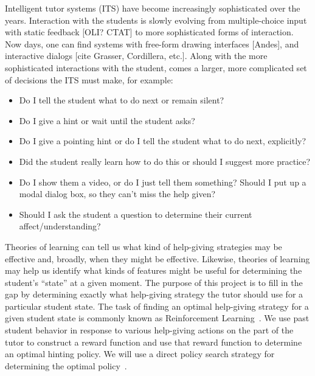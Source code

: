 \documentclass{edm_template}
\begin{document}
Intelligent tutor systems (ITS) have become increasingly sophisticated
over the years.  Interaction with the students is slowly evolving
from multiple-choice input with static feedback [OLI? CTAT] to more 
sophisticated forms of interaction.  Now days, one can find systems with 
free-form drawing interfaces [Andes], and interactive dialogs [cite Grasser,
Cordillera, etc.].  Along with the more sophisticated interactions
with the student, comes a larger, more complicated set of 
decisions the ITS must make, for example:
%
\label{intro}
\begin{itemize}

   \item Do I tell the student what to do next or remain silent?

   \item Do I give a hint or wait until the student asks?

   \item Do I give a pointing hint or do I tell the student 
         what to do next, explicitly?

   \item Did the student really learn how to do this or should
         I suggest more practice?

   \item Do I show them a video, or do I just tell them something?
         Should I put up a modal dialog box, so they can't miss the
         help given?

   \item Should I ask the student a question to determine their 
         current affect/understanding?

\end{itemize}

Theories of learning can tell us what kind of help-giving
strategies may be effective and, broadly, when they might be effective.
Likewise, theories of learning may help us identify what kinds of 
features might be useful for determining the student's ``state'' at
a given moment.  The purpose of this project is to fill in the gap
by determining exactly what help-giving strategy the tutor should use for a 
particular student state.
The task of finding an optimal help-giving strategy for a
given student state is commonly known as 
Reinforcement Learning~\cite{kaelbling_reinforcement_1996}.
We use past student behavior in response to various help-giving
actions on the part of the tutor to construct a reward function
and use that reward function to determine an optimal hinting policy.
We will use a direct policy search strategy for determining the optimal
policy~\cite{rosenstein_robot_2001}.
\end{document}
